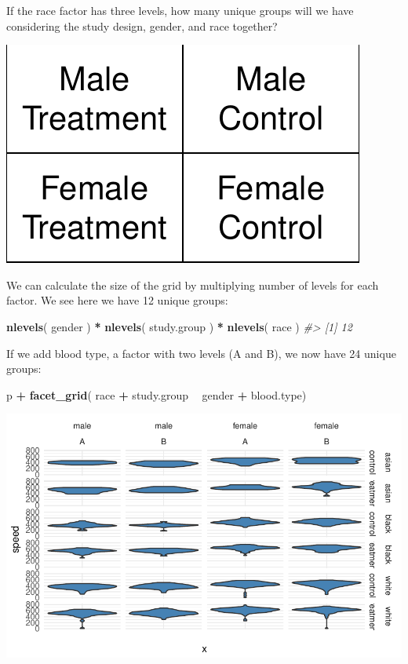 \documentclass[]{book}
\newenvironment{Shaded}{\begin{snugshade}}{\end{snugshade}}
\newcommand{\CommentTok}[1]{\textcolor[rgb]{0.56,0.35,0.01}{\textit{#1}}}
\newcommand{\KeywordTok}[1]{\textcolor[rgb]{0.13,0.29,0.53}{\textbf{#1}}}
\newcommand{\NormalTok}[1]{#1}
\newcommand{\OperatorTok}[1]{\textcolor[rgb]{0.81,0.36,0.00}{\textbf{#1}}}
\newcommand{\StringTok}[1]{\textcolor[rgb]{0.31,0.60,0.02}{#1}}
\theoremstyle{definition}
\theoremstyle{definition}
\theoremstyle{definition}
\theoremstyle{remark}
\begin{document}
If the race factor has three levels, how many unique groups will we have
considering the study design, gender, and race together?

\begin{center}\includegraphics[width=0.7\linewidth]{DS4PS-I_files/figure-latex/unnamed-chunk-138-1} \end{center}

We can calculate the size of the grid by multiplying number of levels
for each factor. We see here we have 12 unique groups:

\begin{Shaded}
\begin{Highlighting}[]

\KeywordTok{nlevels}\NormalTok{( gender ) }\OperatorTok{*}\StringTok{ }\KeywordTok{nlevels}\NormalTok{( study.group ) }\OperatorTok{*}\StringTok{ }\KeywordTok{nlevels}\NormalTok{( race )}
\CommentTok{#> [1] 12}
\end{Highlighting}
\end{Shaded}

If we add blood type, a factor with two levels (A and B), we now have 24
unique groups:

\begin{Shaded}
\begin{Highlighting}[]

\NormalTok{p }\OperatorTok{+}\StringTok{ }\KeywordTok{facet_grid}\NormalTok{( race }\OperatorTok{+}\StringTok{ }\NormalTok{study.group }\OperatorTok{~}\StringTok{ }\NormalTok{gender }\OperatorTok{+}\StringTok{ }\NormalTok{blood.type) }
\end{Highlighting}
\end{Shaded}

\begin{center}\includegraphics[width=0.7\linewidth]{DS4PS-I_files/figure-latex/unnamed-chunk-140-1} \end{center}
\end{document}
